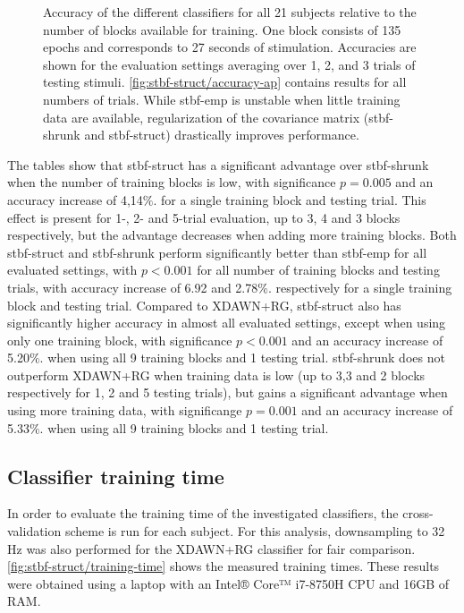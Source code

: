   \begin{figure}
    \sffamily
    
    \caption[Clasifier accuracy in function of available training data.]{%
      Accuracy of the different classifiers for all 21 subjects relative to the
			number of blocks available for training. One block consists of 135
			epochs and corresponds to 27 seconds of stimulation. Accuracies
			are shown for the evaluation settings averaging over 1, 2, and
			3 trials of testing stimuli.
			\cref{fig:stbf-struct/accuracy-ap} contains results for all numbers of trials.
			While \ac{stbf-emp} is unstable when little training data
			are available,
			regularization of the covariance matrix (\ac{stbf-shrunk} and
			\ac{stbf-struct}) drastically improves performance.}
		\label{fig:accuracy}
	\end{figure}

	The tables show that \ac{stbf-struct} has a significant advantage over
  \ac{stbf-shrunk} when the number of training blocks is low, with
  significance $p=0.005$ and  an accuracy increase of 4,14$\%.$ for a single training block
  and testing trial.
  This effect is present for 1-, 2- and 5-trial evaluation, up to 3, 4 and 3
  blocks respectively, but the advantage decreases when adding more training blocks.
	Both \ac{stbf-struct} and \ac{stbf-shrunk} perform significantly better
  than \ac{stbf-emp} for all evaluated settings, with $p<0.001$ for all number
  of training blocks and testing trials, with accuracy
  increase of 6.92 and 2.78$\%.$ respectively for a single training block
  and testing trial.
	Compared to XDAWN+RG, \ac{stbf-struct} also has significantly
	higher accuracy in almost all evaluated settings, except when using only one
  training block, with significance $p<0.001$ and an accuracy increase of
  5.20$\%.$ when using all 9 training blocks and 1 testing trial.
	\ac{stbf-shrunk} does not outperform XDAWN+RG when training data
  is low (up to 3,3 and 2 blocks respectively for 1, 2 and 5 testing trials),
  but gains a significant advantage	when using more training data, with
  significange $p=0.001$ and an accuracy increase of 5.33$\%.$ when using all
  9 training blocks and 1 testing trial.

	\subsection{Classifier training time}
	In order to evaluate the training time of the investigated classifiers, the
	cross-validation scheme is run for each subject.
  For this analysis, downsampling to 32 Hz was also performed for the XDAWN+RG
  classifier for fair comparison.
  \cref{fig:stbf-struct/training-time} shows the measured training times.
	These results were obtained using a laptop with an Intel® Core™ i7-8750H CPU and 16GB of RAM.

